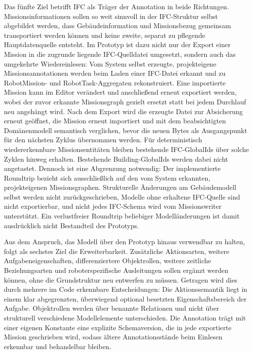Das fünfte Ziel betrifft IFC als Träger der Annotation in beide Richtungen. Missionsinformationen
sollen so weit sinnvoll in der IFC-Struktur selbst abgebildet werden, dass Gebäudeinformation und
Missionsbezug gemeinsam transportiert werden können und keine zweite, separat zu pflegende
Hauptdatenquelle entsteht. Im Prototyp ist dazu nicht nur der Export einer Mission in die zugrunde
liegende IFC-Quelldatei umgesetzt, sondern auch das umgekehrte Wiedereinlesen: Vom System selbst
erzeugte, projekteigene Missionsannotationen werden beim Laden einer IFC-Datei erkannt und zu
RobotMission- und RobotTask-Aggregaten rekonstruiert. Eine importierte Mission kann im Editor
verändert und anschließend erneut exportiert werden, wobei der zuvor erkannte Missionsgraph gezielt
ersetzt statt bei jedem Durchlauf neu angehängt wird. Nach dem Export wird die erzeugte Datei zur
Absicherung erneut geöffnet, die Mission erneut importiert und mit dem beabsichtigten Domänenmodell
semantisch verglichen, bevor die neuen Bytes als Ausgangspunkt für den nächsten Zyklus übernommen
werden. Für deterministisch wiedererkennbare Missionsentitäten bleiben bestehende IFC-GlobalIds über
solche Zyklen hinweg erhalten. Bestehende Building-GlobalIds werden dabei nicht angetastet. Dennoch
ist eine Abgrenzung notwendig: Der implementierte Roundtrip bezieht sich ausschließlich auf den vom
System erkannten, projekteigenen Missionsgraphen. Strukturelle Änderungen am Gebäudemodell selbst
werden nicht zurückgeschrieben, Modelle ohne erhaltene IFC-Quelle sind nicht exportierbar, und nicht
jedes IFC-Schema wird vom Missionswriter unterstützt. Ein verlustfreier Roundtrip beliebiger
Modelländerungen ist damit ausdrücklich nicht Bestandteil des Prototyps.

Aus dem Anspruch, das Modell über den Prototyp hinaus verwendbar zu halten, folgt als sechstes Ziel
die Erweiterbarkeit. Zusätzliche Aktionsarten, weitere Aufgabeneigenschaften, differenziertere
Objektrollen, weitere zeitliche Beziehungsarten und roboterspezifische Ausleitungen sollen ergänzt
werden können, ohne die Grundstruktur neu entwerfen zu müssen. Getragen wird dies durch mehrere im
Code erkennbare Entscheidungen: Die Aktionssemantik liegt in einem klar abgegrenzten, überwiegend
optional besetzten Eigenschaftsbereich der Aufgabe. Objektrollen werden über benannte Relationen und
nicht über strukturell verschiedene Modellelemente unterschieden. Die Annotation trägt mit einer
eigenen Konstante eine explizite Schemaversion, die in jede exportierte Mission geschrieben wird,
sodass ältere Annotationsstände beim Einlesen erkennbar und behandelbar bleiben.

